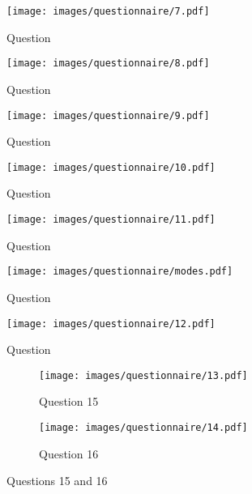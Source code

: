 \begin{figure}[H]
	\centering
	\texttt{[image: images/questionnaire/7.pdf]}
	\caption{Question}
	\label{fig:q 8}
\end{figure}

\begin{figure}[H]
	\centering
	\texttt{[image: images/questionnaire/8.pdf]}
	\caption{Question}
	\label{fig:q 9}
\end{figure}

\begin{figure}[H]
	\centering
	\texttt{[image: images/questionnaire/9.pdf]}
	\caption{Question}
	\label{fig:q 10}
\end{figure}

\begin{figure}[H]
	\centering
	\texttt{[image: images/questionnaire/10.pdf]}
	\caption{Question}
	\label{fig:q 11}
\end{figure}

\begin{figure}[H]
	\centering
	\texttt{[image: images/questionnaire/11.pdf]}
	\caption{Question}
	\label{fig:q 12}
\end{figure}

\begin{figure}[H]
	\centering
	\texttt{[image: images/questionnaire/modes.pdf]}
	\caption{Question}
	\label{fig:q 13}
\end{figure}

\begin{figure}[H]
	\centering
	\texttt{[image: images/questionnaire/12.pdf]}
	\caption{Question}
	\label{fig:q 14}
\end{figure}

\begin{figure}[H]
	\centering
	\begin{subfigure}[b]{0.5\textwidth}
		\centering
		\texttt{[image: images/questionnaire/13.pdf]}
		\caption{Question 15}
		\label{fig:q 15}
	\end{subfigure}%
	\hfill
	\begin{subfigure}[b]{0.5\textwidth}
		\centering
		\texttt{[image: images/questionnaire/14.pdf]}
		\caption{Question 16}
		\label{fig:q 16}
	\end{subfigure}%
	\caption{Questions 15 and 16}
	\label{fig:q 15 and 16}
\end{figure}

